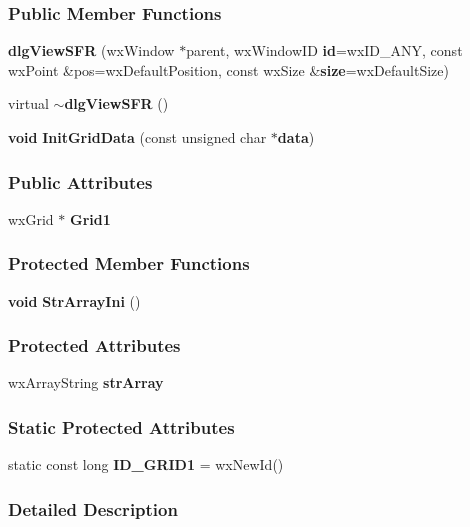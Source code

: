 \subsubsection*{Public Member Functions}
\begin{DoxyCompactItemize}
\item 
{\bf dlg\+View\+S\+FR} (wx\+Window $\ast$parent, wx\+Window\+ID {\bf id}=wx\+I\+D\+\_\+\+A\+NY, const wx\+Point \&pos=wx\+Default\+Position, const wx\+Size \&{\bf size}=wx\+Default\+Size)
\item 
virtual {\bf $\sim$dlg\+View\+S\+FR} ()
\item 
{\bf void} {\bf Init\+Grid\+Data} (const unsigned char $\ast${\bf data})
\end{DoxyCompactItemize}
\subsubsection*{Public Attributes}
\begin{DoxyCompactItemize}
\item 
wx\+Grid $\ast$ {\bf Grid1}
\end{DoxyCompactItemize}
\subsubsection*{Protected Member Functions}
\begin{DoxyCompactItemize}
\item 
{\bf void} {\bf Str\+Array\+Ini} ()
\end{DoxyCompactItemize}
\subsubsection*{Protected Attributes}
\begin{DoxyCompactItemize}
\item 
wx\+Array\+String {\bf str\+Array}
\end{DoxyCompactItemize}
\subsubsection*{Static Protected Attributes}
\begin{DoxyCompactItemize}
\item 
static const long {\bf I\+D\+\_\+\+G\+R\+I\+D1} = wx\+New\+Id()
\end{DoxyCompactItemize}


\subsubsection{Detailed Description}


